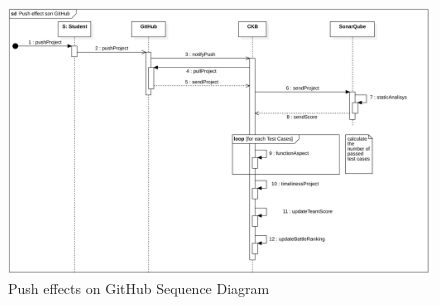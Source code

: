 \begin{figure}[h]
    \centering
    \includegraphics[scale=0.5]{images/SD/PushGitHubSD.png} 
    \caption{Push effects on GitHub Sequence Diagram}
    \label{fig_PushGitHubSD}
\end{figure}


